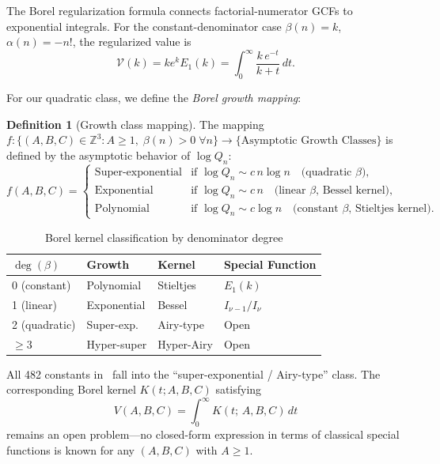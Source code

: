 \documentclass[11pt,a4paper]{article}
\theoremstyle{definition}
\newtheorem{definition}[theorem]{Definition}
\theoremstyle{remark}
\begin{document}
The Borel regularization formula connects factorial-numerator GCFs to
exponential integrals.  For the constant-denominator case
$\beta(n) = k$, $\alpha(n) = -n!$, the regularized value is
\begin{equation}\label{eq:borel}
  \mathcal{V}(k) = k e^k E_1(k)
  = \int_0^{\infty} \frac{k\,e^{-t}}{k+t}\,dt.
\end{equation}

For our quadratic class, we define the \emph{Borel growth mapping}:

\begin{definition}[Growth class mapping]\label{def:borel_map}
The mapping $f\colon \{(A,B,C) \in \mathbb{Z}^3 : A \ge 1,\;
\beta(n)>0\;\forall n\} \to \{\text{Asymptotic Growth Classes}\}$
is defined by the asymptotic behavior of $\log Q_n$:
\[
  f(A,B,C) = \begin{cases}
    \text{Super-exponential} & \text{if } \log Q_n \sim c\,n\log n
      \quad\text{(quadratic $\beta$)},\\
    \text{Exponential} & \text{if } \log Q_n \sim c\,n
      \quad\text{(linear $\beta$, Bessel kernel)},\\
    \text{Polynomial} & \text{if } \log Q_n \sim c\log n
      \quad\text{(constant $\beta$, Stieltjes kernel)}.
  \end{cases}
\]
\end{definition}

\begin{table}[h]
\centering
\caption{Borel kernel classification by denominator degree}
\begin{tabular}{llll}
\toprule
$\deg(\beta)$ & Growth & Kernel & Special Function \\
\midrule
0 (constant) & Polynomial & Stieltjes & $E_1(k)$ \\
1 (linear)   & Exponential & Bessel & $I_{\nu-1}/I_\nu$ \\
2 (quadratic)& Super-exp.\ & Airy-type & Open \\
$\ge 3$      & Hyper-super & Hyper-Airy & Open \\
\bottomrule
\end{tabular}\label{tab:borel}
\end{table}

All 482 constants in~\cite{pcf_vquad} fall into the ``super-exponential / Airy-type''
class. The corresponding Borel kernel $K(t; A,B,C)$ satisfying
\[
  V(A,B,C) = \int_0^\infty K(t;\,A,B,C)\,dt
\]
remains an open problem---no closed-form expression in terms of classical
special functions is known for any $(A,B,C)$ with $A \ge 1$.
\end{document}
